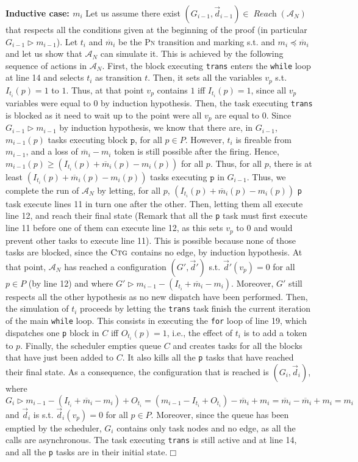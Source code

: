 \documentclass[runningheads,oribibl,]{article}
\newcommand{\mleq}{\preceq}
\newcommand{\Aa}{\ensuremath{\mathcal{A}}\xspace}
\newcommand{\mbar}{\ensuremath{\overline{m}}\xspace}
\newcommand{\pn}{\textsc{Pn}\xspace}
\DeclareMathOperator{\Reach}{\textit{Reach}}
\newcommand{\Data}{\ensuremath{\vec{d}}}
\newcommand{\ctg}{\ensuremath{\textsc{Ctg}}\xspace}
\newenvironment{proof}{\noindent{\it Proof.\hspace*{.5cm}}}{}
\newcommand{\qed}{\hfill$\Box$}
\begin{document}
\begin{proof}
  \textbf{Inductive case: $m_i$} Let us assume there exist
  $(G_{i-1},\Data_{i-1})\in\Reach(\Aa_N)$ that respects all the
  conditions given at the beginning of the proof (in particular
  $G_{i-1}\rhd m_{i-1}$). Let $t_i$ and $\mbar_i$ be the \pn transition
  and marking s.t. \smash{$m_{i-1}\xrightarrow{t_i}\mbar_i$} and
  $m_i\mleq\mbar_i$ and let us show that $\Aa_N$ can simulate it. This
  is achieved by the following sequence of actions in $\Aa_N$. First,
  the block executing \texttt{trans} enters the \texttt{while} loop at
  line 14 and selects $t_i$ as transition $t$. Then, it sets all the
  variables $v_p$ s.t. $I_{t_i}(p)=1$ to $1$. Thus, at that point
  $v_p$ contains $1$ iff $I_{t_i}(p)=1$, since all $v_p$ variables
  were equal to $0$ by induction hypothesis. Then, the task executing
  \texttt{trans} is blocked as it need to wait up to the point were
  all $v_p$ are equal to $0$. Since $G_{i-1}\rhd m_{i-1}$ by induction
  hypothesis, we know that there are, in $G_{i-1}$, $m_{i-1}(p)$ tasks
  executing block $\mathtt{p}$, for all $p\in P$. However, $t_i$ is
  fireable from $m_{i-1}$, and a loss of $\mbar_i-m_i$ token is still
  possible after the firing. Hence, $m_{i-1}(p)\geq
  (I_{t_i}(p)+\mbar_i(p)-m_i(p))$ for all $p$. Thus, for all $p$,
  there is at least $(I_{t_i}(p)+\mbar_i(p)-m_i(p))$ tasks executing
  $\mathtt{p}$ in $G_{i-1}$. Thus, we complete the run of $\Aa_N$ by
  letting, for all $p$, $(I_{t_i}(p)+\mbar_i(p)-m_i(p))$ \texttt{p}
  task execute lines 11 in turn one after the other. Then, letting
  them all execute line 12, and reach their final state (Remark that
  all the \texttt{p} task must first execute line 11 before one of
  them can execute line 12, as this sets $v_p$ to $0$ and would
  prevent other tasks to execute line 11). This is possible because
  none of those tasks are blocked, since the \ctg contains no edge, by
  induction hypothesis. At that point, $\Aa_N$ has reached a
  configuration $(G',\Data')$ s.t. $\Data'(v_p)=0$ for all $p\in P$
  (by line 12) and where $G'\rhd
  m_{i-1}-(I_{t_i}+\mbar_i-m_i)$. Moreover, $G'$ still respects all
  the other hypothesis as no new dispatch have been performed. Then,
  the simulation of $t_i$ proceeds by letting the \texttt{trans} task
  finish the current iteration of the main \texttt{while} loop. This
  consists in executing the \texttt{for} loop of line 19, which
  dispatches one \texttt{p} block in $C$ iff $O_{t_i}(p)=1$, i.e., the
  effect of $t_i$ is to add a token to $p$. Finally, the scheduler
  empties queue $C$ and creates tasks for all the blocks that have
  just been added to $C$. It also kills all the \texttt{p} tasks that
  have reached their final state. As a consequence, the configuration
  that is reached is $(G_i, \Data_i)$, where $G_i\rhd
  m_{i-1}-(I_{t_i}+\mbar_i-m_i)+O_{t_i} =
  (m_{i-1}-I_{t_i}+O_{t_i})-\mbar_i+m_i = \mbar_i-\mbar_i+m_i = m_i$
  and $\Data_i$ is s.t. $\Data_i(v_p)=0$ for all $p\in P$. Moreover,
  since the queue has been emptied by the scheduler, $G_i$ contains
  only task nodes and no edge, as all the calls are asynchronous. The
  task executing \texttt{trans} is still active and at line 14, and
  all the \texttt{p} tasks are in their initial state.\qed
\end{proof}
\end{document}
